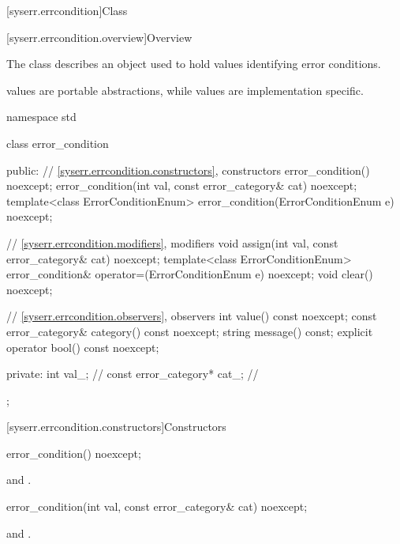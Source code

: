 [syserr.errcondition]{Class }

[syserr.errcondition.overview]{Overview}

\pnum
The class  describes an object used to hold values identifying
error conditions.
\begin{note}
 values are portable abstractions,
while  values are implementation specific.
\end{note}

%
\begin{codeblock}
namespace std {
  class error_condition {
  public:
    // \ref{syserr.errcondition.constructors}, constructors
    error_condition() noexcept;
    error_condition(int val, const error_category& cat) noexcept;
    template<class ErrorConditionEnum>
      error_condition(ErrorConditionEnum e) noexcept;

    // \ref{syserr.errcondition.modifiers}, modifiers
    void assign(int val, const error_category& cat) noexcept;
    template<class ErrorConditionEnum>
      error_condition& operator=(ErrorConditionEnum e) noexcept;
    void clear() noexcept;

    // \ref{syserr.errcondition.observers}, observers
    int value() const noexcept;
    const error_category& category() const noexcept;
    string message() const;
    explicit operator bool() const noexcept;

  private:
    int val_;                   // \expos
    const error_category* cat_; // \expos
  };
}
\end{codeblock}

[syserr.errcondition.constructors]{Constructors}

%
\begin{itemdecl}
error_condition() noexcept;
\end{itemdecl}

\begin{itemdescr}
\pnum
\ensures
{} and .
\end{itemdescr}

%
\begin{itemdecl}
error_condition(int val, const error_category& cat) noexcept;
\end{itemdecl}

\begin{itemdescr}
\pnum
\ensures
{} and .
\end{itemdescr}

